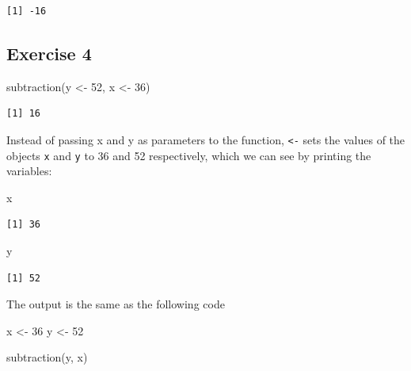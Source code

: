 \documentclass[
  letterpaper,
  DIV=11,
  numbers=noendperiod]{scrreprt}
\newenvironment{Shaded}{\begin{snugshade}}{\end{snugshade}}
\newcommand{\DecValTok}[1]{\textcolor[rgb]{0.68,0.00,0.00}{#1}}
\newcommand{\FunctionTok}[1]{\textcolor[rgb]{0.28,0.35,0.67}{#1}}
\newcommand{\NormalTok}[1]{\textcolor[rgb]{0.00,0.23,0.31}{#1}}
\newcommand{\OtherTok}[1]{\textcolor[rgb]{0.00,0.23,0.31}{#1}}
\begin{document}
\begin{verbatim}
[1] -16
\end{verbatim}

\subsection{Exercise 4}\label{exercise-4}

\begin{Shaded}
\begin{Highlighting}[]
\FunctionTok{subtraction}\NormalTok{(y }\OtherTok{\textless{}{-}} \DecValTok{52}\NormalTok{, x }\OtherTok{\textless{}{-}} \DecValTok{36}\NormalTok{)}
\end{Highlighting}
\end{Shaded}

\begin{verbatim}
[1] 16
\end{verbatim}

Instead of passing x and y as parameters to the function,
\texttt{\textless{}-} sets the values of the objects \texttt{x} and
\texttt{y} to 36 and 52 respectively, which we can see by printing the
variables:

\begin{Shaded}
\begin{Highlighting}[]
\NormalTok{x}
\end{Highlighting}
\end{Shaded}

\begin{verbatim}
[1] 36
\end{verbatim}

\begin{Shaded}
\begin{Highlighting}[]
\NormalTok{y}
\end{Highlighting}
\end{Shaded}

\begin{verbatim}
[1] 52
\end{verbatim}

The output is the same as the following code

\begin{Shaded}
\begin{Highlighting}[]
\NormalTok{x }\OtherTok{\textless{}{-}} \DecValTok{36}
\NormalTok{y }\OtherTok{\textless{}{-}} \DecValTok{52}

\FunctionTok{subtraction}\NormalTok{(y, x)}
\end{Highlighting}
\end{Shaded}
\end{document}
